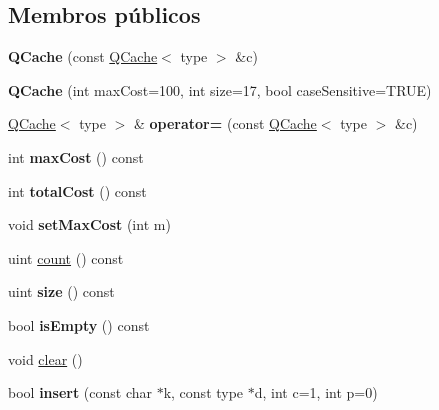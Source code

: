 \subsection*{Membros públicos}
\begin{DoxyCompactItemize}
\item 
\hypertarget{class_q_cache_ab93fd941074cab82c3aef41df27ddf86}{{\bfseries Q\-Cache} (const \hyperlink{class_q_cache}{Q\-Cache}$<$ type $>$ \&c)}\label{class_q_cache_ab93fd941074cab82c3aef41df27ddf86}

\item 
\hypertarget{class_q_cache_ae64a0e22ca6031b65cfc9ecf229103c8}{{\bfseries Q\-Cache} (int max\-Cost=100, int size=17, bool case\-Sensitive=T\-R\-U\-E)}\label{class_q_cache_ae64a0e22ca6031b65cfc9ecf229103c8}

\item 
\hypertarget{class_q_cache_a2ef0f31f8acbe6448dbbe9537dab7755}{\hyperlink{class_q_cache}{Q\-Cache}$<$ type $>$ \& {\bfseries operator=} (const \hyperlink{class_q_cache}{Q\-Cache}$<$ type $>$ \&c)}\label{class_q_cache_a2ef0f31f8acbe6448dbbe9537dab7755}

\item 
\hypertarget{class_q_cache_a4f12dace19b47168c151cf6fee713003}{int {\bfseries max\-Cost} () const }\label{class_q_cache_a4f12dace19b47168c151cf6fee713003}

\item 
\hypertarget{class_q_cache_aed467348a4bbd41b4b4d9d5f63a63a6e}{int {\bfseries total\-Cost} () const }\label{class_q_cache_aed467348a4bbd41b4b4d9d5f63a63a6e}

\item 
\hypertarget{class_q_cache_a7de9a59b3e481b331b86e50055ac5a1e}{void {\bfseries set\-Max\-Cost} (int m)}\label{class_q_cache_a7de9a59b3e481b331b86e50055ac5a1e}

\item 
uint \hyperlink{class_q_cache_a774149fc271ebaba2aabcd183a836e8f}{count} () const 
\item 
\hypertarget{class_q_cache_a7e63723212bed1ca52f0fe57e58b812e}{uint {\bfseries size} () const }\label{class_q_cache_a7e63723212bed1ca52f0fe57e58b812e}

\item 
\hypertarget{class_q_cache_a479432127ee77145cc19d6a2d1590821}{bool {\bfseries is\-Empty} () const }\label{class_q_cache_a479432127ee77145cc19d6a2d1590821}

\item 
void \hyperlink{class_q_cache_ac8bb3912a3ce86b15842e79d0b421204}{clear} ()
\item 
\hypertarget{class_q_cache_ab44c6a688d602246ee182cc9193d71a0}{bool {\bfseries insert} (const char $\ast$k, const type $\ast$d, int c=1, int p=0)}\label{class_q_cache_ab44c6a688d602246ee182cc9193d71a0}


\end{DoxyCompactItemize}
